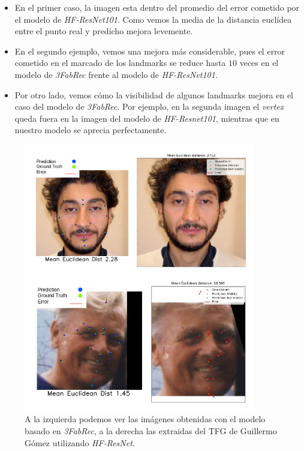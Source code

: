             \begin{itemize}
                \item En el primer caso, la imagen esta dentro del promedio del error cometido por el modelo de \textit{HF-ResNet101}. Como vemos la media de la distancia euclídea entre el punto real y predicho mejora levemente.
                \item En el segundo ejemplo, vemos una mejora más considerable, pues el error cometido en el marcado de los landmarks se reduce hasta $10$ veces en el modelo de \textit{3FabRec} frente al modelo de \textit{HF-ResNet101}. 
                \item Por otro lado, vemos cómo la visibilidad de algunos landmarks mejora en el caso del modelo de \textit{3FabRec}. Por ejemplo, en la segunda imagen el \textit{vertex} queda fuera en la imagen del modelo de \textit{HF-Resnet101}, mientras que en nuestro modelo se aprecia perfectamente.
            \end{itemize}

            \begin{figure}[h]
                \centering
                \includegraphics[width=0.9\textwidth]{img/cualitativa.png}
                \caption{A la izquierda podemos ver las imágenes obtenidas con el modelo basado en \textit{3FabRec}, a la derecha las extraidas del TFG de Guillermo Gómez utilizando \textit{HF-ResNet}.}
                \label{fig:comparativa_estado_arte}
            \end{figure}
            
